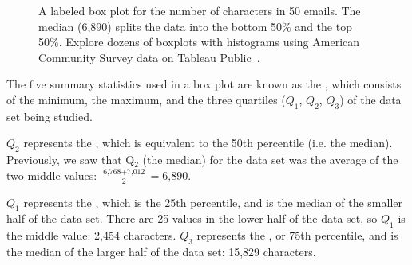 \begin{figure}[h]
   \centering
\caption{A labeled box plot for the number of characters in 50 emails. The median (6,890) splits the data into the bottom 50\% and the top 50\%.  Explore dozens of boxplots with histograms using American Community Survey data on Tableau Public~.}
   \label{boxPlotLayoutNumVar}
\end{figure}

The five summary statistics used in a box plot are known as the , which consists of the minimum, the maximum, and the three quartiles ($Q_1$, $Q_2$, $Q_3$) of the data set being studied.

$Q_2$ represents the , which is equivalent to the 50th percentile (i.e. the median). Previously, we saw that Q$_2$ (the median) for the  data set was the average of the two middle values: $\frac{\text{6,768} + \text{7,012}}{2} = \text{6,890}$.

$Q_1$ represents the , which is the 25th percentile, and is the median of the smaller half of the data set. There are 25 values in the lower half of the data set, so $Q_1$ is the middle value: 2,454 characters. $Q_3$ represents the , or 75th percentile, and is the median of the larger half of the data set: 15,829 characters.

